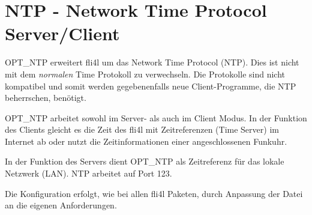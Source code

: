 {
\section {NTP - Network Time Protocol Server/Client}
}

OPT\_NTP erweitert fli4l um das Network Time Protocol (NTP). 
Dies ist nicht mit dem \emph{normalen} Time Protokoll zu
verwechseln. Die Protokolle sind nicht
kompatibel und somit werden gegebenenfalls neue Client-Programme, die NTP
beherrschen, benötigt.

OPT\_NTP arbeitet sowohl im  Server- als auch im Client Modus. In der
Funktion des Clients gleicht es die Zeit des fli4l mit Zeitreferenzen (Time
Server) im Internet ab oder nutzt die Zeitinformationen einer angeschlossenen
Funkuhr.

In der Funktion des Servers dient OPT\_NTP als Zeitreferenz für das lokale
Netzwerk (LAN). NTP arbeitet auf Port 123.


Die Konfiguration erfolgt, wie bei allen fli4l Paketen, durch Anpassung der Datei\\
 an die eigenen Anforderungen.

